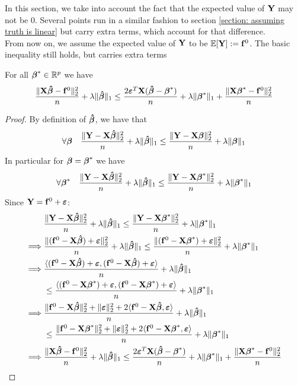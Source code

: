 In this section, we take into account the fact that the expected value of \(\Y\) may not be 0. Several points run in a similar fashion to section \ref{section: assuming truth is linear} but carry extra terms, which account for that difference. \\
From now on, we assume the expected value of \(\Y\) to be \(\mathbb{E} [\mathbf{Y}] :=\f^{0}\). The basic inequality still holds, but carries extra terms
\begin{lemma}
    For all \(\bta^* \in \R^p\) we have
    \begin{equation}
        \frac{\|\X \btahat - \f^0 \|_{2}^{2}}{n} + \lambda\| \btahat \|_{1} \leq \frac{2 \eps^T \X (\btahat - \bta^*)}{n} + \lambda \| \bta^*\|_{1} + \frac{\|\X \bta^* - \f^0\|_{2}^{2}}{n}
    \end{equation}
\end{lemma}
\begin{proof}
    By definition of \(\btahat\), we have that
    \[
        \forall \bta \quad \frac{\| \Y -\X \btahat \|_{2}^{2}}{n} + \lambda \| \btahat \|_{1} \leq \frac{\|\Y-\X \bta \|_{2}^{2}}{n}+\lambda \| \bta \|_{1}
    \]
    In particular for $\bta = \bta^*$ we have
    \[
        \forall \bta^* \quad \frac{\| \Y -\X \btahat \|_{2}^{2}}{n} + \lambda \| \btahat \|_{1} \leq \frac{\|\Y-\X \bta^* \|_{2}^{2}}{n}+\lambda \| \bta^* \|_{1}
    \]
    Since $\Y = \f^0 + \eps$:
    \begin{align*}
                 & \frac{\|\Y  - \X \btahat \|_{2}^{2}}{n} + \lambda \| \btahat\|_{1} \leq \frac{\| \Y  - \X \bta^* \|_2^2}{n}+\lambda\|\bta^{*}\|_{1}                                       \\
        \implies &
        \frac{\| (\f^0 - \X \btahat ) + \eps \|_{2}^{2}}{n} + \lambda\| \btahat \|_{1} \leq \frac{ \| (\f^0 - \X \bta^*) + \eps \|_{2}^{2}}{n}+\lambda \| \bta^*\|_{1}                       \\
        \implies &
        \frac{\langle (\f^0 - \X \btahat ) + \eps, (\f^0 - \X \btahat ) + \eps \rangle}{n} + \lambda\| \btahat \|_{1}                                                                        \\
                 & \leq \frac{ \langle (\f^0 - \X \bta^*) + \eps, (\f^0 - \X \bta^*) + \eps \rangle}{n}+\lambda \| \bta^*\|_{1}                                                              \\
        \implies &
        \frac{\|\f^0 - \X \btahat \|_{2}^{2} + \| \eps \|_{2}^{2} + 2\langle \f^0 - \X \btahat, \eps \rangle}{n} + \lambda\| \btahat \|_{1}                                                  \\
                 & \leq \frac{\|\f^0 - \X \bta^* \|_{2}^{2} + \| \eps \|_{2}^{2} + 2\langle \f^0 - \X \bta^*, \eps \rangle}{n}+\lambda \| \bta^*\|_{1}                                       \\
        \implies &
        \frac{\|\X \btahat - \f^0 \|_{2}^{2}}{n} + \lambda\| \btahat \|_{1} \leq \frac{2 \eps^T \X (\btahat - \bta^*)}{n} + \lambda \| \bta^*\|_{1} + \frac{\|\X \bta^* - \f^0\|_{2}^{2}}{n} \\
    \end{align*}
\end{proof}
